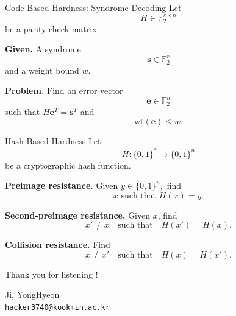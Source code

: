 \documentclass[serif, aspectratio=169]{beamer}
\begin{document}
	\begin{frame}{Code-Based Hardness: Syndrome Decoding}
	Let
	\[
	H \in \mathbb{F}_2^{r \times n}
	\]
	be a parity-check matrix.
	
	\vspace{1.2em}
	\textbf{Given.}
	A syndrome
	\[
	\bm{s} \in \mathbb{F}_2^r
	\]
	and a weight bound $w$.
	
	\vspace{1.2em}
	\textbf{Problem.}
	Find an error vector
	\[
	\bm{e} \in \mathbb{F}_2^n
	\]
	such that $
	H\bm{e}^T = \bm{s}^T$
	and
	\[
	\mathrm{wt}(\bm{e}) \le w.
	\]
	
%	
%	
\end{frame}

\begin{frame}{Hash-Based Hardness}
	Let
	\[
	H : \{0,1\}^\ast \to \{0,1\}^n
	\]
	be a cryptographic hash function.
	
	\vspace{1.2em}
	\textbf{Preimage resistance.}
	Given
	$
	y \in \{0,1\}^n,
	$
	find
	\[
	x \text{ such that } H(x)=y.
	\]
	
	\vspace{1.2em}
	\textbf{Second-preimage resistance.}
	Given $x$, find
	\[
	x' \neq x
	\quad \text{such that} \quad
	H(x') = H(x).
	\]
	
	\vspace{1.2em}
	\textbf{Collision resistance.}
	Find
	\[
	x \neq x'
	\quad \text{such that} \quad
	H(x)=H(x').
	\]
	
	
\end{frame}
	
	\begin{frame}
		\begin{center}
			{ Thank you for listening !}
			\vspace{1cm}
			
			Ji, YongHyeon \\[1em]
			\texttt{hacker3740@kookmin.ac.kr} 
		\end{center}
	\end{frame}
	
\end{document}
